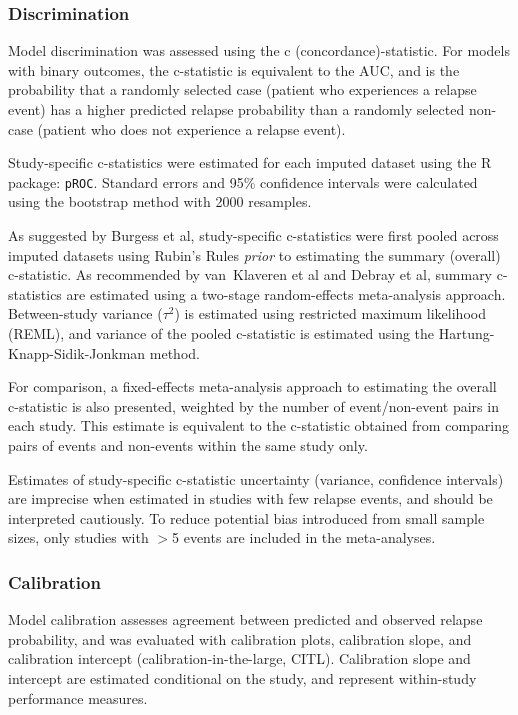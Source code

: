 \subsubsection{\label{meth:discrimination}Discrimination}

Model discrimination was assessed using the c (concordance)-statistic. For models with binary outcomes, the c-statistic is equivalent to the AUC, and is the probability that a randomly selected case (patient who experiences a relapse event) has a higher predicted relapse probability than a randomly selected non-case (patient who does not experience a relapse event).

Study-specific c-statistics were estimated for each imputed dataset using the R package: \texttt{pROC}\cite{proc2011}. Standard errors and 95\% confidence intervals were calculated using the bootstrap method with 2000 resamples.

As suggested by Burgess et al, study-specific c-statistics were first pooled across imputed datasets using Rubin's Rules \textit{prior} to estimating the summary (overall) c-statistic\cite{burgess2013}. As recommended by van~Klaveren et al\cite{van-klaveren2014} and Debray et al\cite{debray2017}, summary c-statistics are estimated using a two-stage random-effects meta-analysis approach. Between-study variance ($\tau^2$) is estimated using restricted maximum likelihood (REML), and variance of the pooled c-statistic is estimated using the Hartung-Knapp-Sidik-Jonkman method\cite{knapp2003}.

For comparison, a fixed-effects meta-analysis approach to estimating the overall c-statistic is also presented, weighted by the number of event/non-event pairs in each study. This estimate is equivalent to the c-statistic obtained from comparing pairs of events and non-events within the same study only\cite{wynants2018, vanoirbeek2012}.

Estimates of study-specific c-statistic uncertainty (variance, confidence intervals) are imprecise when estimated in studies with few relapse events, and should be interpreted cautiously. To reduce potential bias introduced from small sample sizes, only studies with $>$5 events are included in the meta-analyses\cite{obuchowski1998, hanczar2010}.

\subsubsection{Calibration}

Model calibration assesses agreement between predicted and observed relapse probability, and was evaluated with calibration plots, calibration slope, and calibration intercept (calibration-in-the-large, CITL). Calibration slope and intercept are estimated conditional on the study, and represent within-study performance measures\cite{wynants2018}.

